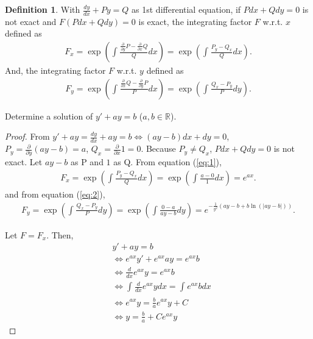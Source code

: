 \documentclass[12pt]{article}
\theoremstyle{definition}
\newtheorem{definition}{Definition}
\newtheorem{corollary}{Corollary}[theorem]
\newenvironment{problem}[2][Problem]{\begin{trivlist}
    \item[\hskip \labelsep {\bfseries #1}\hskip \labelsep {\bfseries #2.}]}{\end{trivlist}}
\begin{document}
\begin{definition}
    With $\frac{dy}{dx}+Py=Q$ as 1st differential equation, if $Pdx+Qdy=0$ is not exact and $F(Pdx+Qdy)=0$ is exact, the integrating factor $F$ w.r.t. $x$ defined as 
    \begin{align}
        F_{x}=\exp\left(\int_{}^{}\frac{\frac{\partial}{\partial y}P-\frac{\partial}{\partial x}Q}{Q}dx\right)=\exp\left(\int_{}^{}\frac{P_y-Q_x}{Q}dx\right).\label{eq:1}
    \end{align}
    And, the integrating factor $F$ w.r.t. $y$ defined as 
    \begin{align}
        F_{y}=\exp\left(\int_{}^{}\frac{\frac{\partial}{\partial x}Q-\frac{\partial}{\partial y}P}{P}dx\right)=\exp\left(\int_{}^{}\frac{Q_x-P_y}{P}dy\right).\label{eq:2}
    \end{align}    
\end{definition}

\begin{problem}{1}
    Determine a solution of $y'+ay=b$ ($a,b \in \mathbb{R}$).
\end{problem}
\begin{proof}
    From $y'+ay = \frac{dy}{dx}+ay=b \Leftrightarrow (ay-b)dx+dy=0$, $P_{y}=\frac{\partial}{\partial y}(ay-b)=a$, $Q_{x}=\frac{\partial}{\partial x}1=0$. Because $P_{y} \neq Q_{x}$, $Pdx+Qdy=0$ is not exact. Let $ay-b$ as P and $1$ as Q. From equation (\ref{eq:1}),
    \begin{align}
        F_{x} = \exp\left(\int_{}^{}\frac{P_y-Q_x}{Q}dx\right) =\exp\left(\int_{}^{}\frac{a-0}{1}dx\right)=e^{ax}.
    \end{align}
    and from equation (\ref{eq:2}),
    \begin{align}
        F_{y} = \exp\left(\int_{}^{}\frac{Q_x-P_y}{P}dy\right)=\exp\left(\int_{}^{}\frac{0-a}{ay-b}dy\right)=e^{-\frac{1}{y^2}(ay-b+b \ln (|ay-b|))}.
    \end{align}


Let $F=F_{x}$. Then, 
\begin{align}
    & y'+ay=b \\
    & \Leftrightarrow e^{ax} y' + e^{ax} ay = e^{ax} b \\
    & \Leftrightarrow \frac{d}{dx}e^{ax}y = e^{ax} b \\
    & \Leftrightarrow \int_{}^{} \frac{d}{dx} e^{ax}y dx = \int_{}^{} e^{ax} b dx \\
    & \Leftrightarrow e^{ax}y = \frac{b}{a}e^{ax}y + C \\
    & \Leftrightarrow y = \frac{b}{a} + C e^{ax}y
\end{align}
\end{proof}
    
\end{document}
